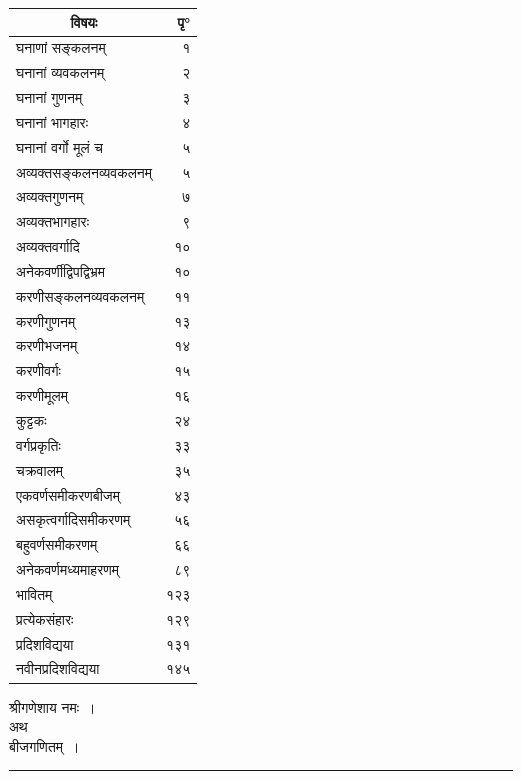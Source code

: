 \documentclass[11pt,a4paper]{article}
\newcommand{\dev}[1]{{\devanagarifont #1}}
\newcommand{\shortline}{\noindent\rule{0.5\textwidth}{0.4pt}\par}
\begin{document}
\begin{center}
\renewcommand{\arraystretch}{1.4}
\begin{longtable}{p{7cm}r}
\toprule
\multicolumn{1}{c}{\textbf{\dev{विषयः}}} & \textbf{\dev{पृ°}} \\
\midrule
\endhead
\dev{घनाणां सङ्कलनम्} & \dev{१} \\
\dev{घनानां व्यवकलनम्} & \dev{२} \\
\dev{घनानां गुणनम्} & \dev{३} \\
\dev{घनानां भागहारः} & \dev{४} \\
\dev{घनानां वर्गो मूलं च} & \dev{५} \\
\dev{अव्यक्तसङ्कलनव्यवकलनम्} & \dev{५} \\
\dev{अव्यक्तगुणनम्} & \dev{७} \\
\dev{अव्यक्तभागहारः} & \dev{९} \\
\dev{अव्यक्तवर्गादि} & \dev{१०} \\
\dev{अनेकवर्णीद्विपद्विभ्रम} & \dev{१०} \\
\dev{करणीसङ्कलनव्यवकलनम्} & \dev{११} \\
\dev{करणीगुणनम्} & \dev{१३} \\
\dev{करणीभजनम्} & \dev{१४} \\
\dev{करणीवर्गः} & \dev{१५} \\
\dev{करणीमूलम्} & \dev{१६} \\
\dev{कुट्टकः} & \dev{२४} \\
\dev{वर्गप्रकृतिः} & \dev{३३} \\
\dev{चक्रवालम्} & \dev{३५} \\
\dev{एकवर्णसमीकरणबीजम्} & \dev{४३} \\
\dev{असकृत्वर्गादिसमीकरणम्} & \dev{५६} \\
\dev{बहुवर्णसमीकरणम्} & \dev{६६} \\
\dev{अनेकवर्णमध्यमाहरणम्} & \dev{८९} \\
\dev{भावितम्} & \dev{१२३} \\
\dev{प्रत्येकसंहारः} & \dev{१२९} \\
\dev{प्रदिशविद्यया} & \dev{१३१} \\
\dev{नवीनप्रदिशविद्यया} & \dev{१४५} \\
\bottomrule
\end{longtable}
\end{center}
\clearpage

\thispagestyle{empty}
\vspace*{1cm}
\begin{center}
{\Large\dev{श्रीगणेशाय नमः~।}}\\[0.8cm]
{\Huge\dev{अथ}}\\[0.3cm]
{\Huge\dev{बीजगणितम्~।}}\\[0.5cm]
\shortline
\end{center}
\vspace{1cm}
\end{document}
